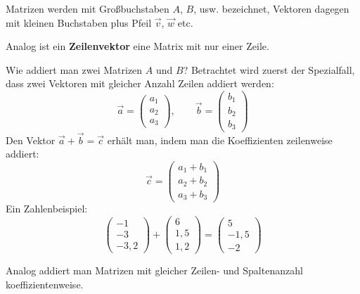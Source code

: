 Matrizen werden mit Großbuchstaben $A$, $B$, usw. bezeichnet, Vektoren dagegen mit kleinen Buchstaben plus Pfeil $\vec{v}$, $\vec{w}$ etc.

Analog ist ein \textbf{Zeilenvektor} eine Matrix mit nur einer Zeile.

Wie addiert man zwei Matrizen $A$ und $B$? Betrachtet wird zuerst der Spezialfall, dass zwei Vektoren mit gleicher Anzahl Zeilen addiert werden:
\[ \vec{a} = \begin{pmatrix} a_1 \\ a_2 \\ a_3 \end{pmatrix} , \qquad \vec{b} = \begin{pmatrix} b_1 \\ b_2 \\ b_3 \end{pmatrix} \]
Den Vektor $\vec{a} + \vec{b} = \vec{c}$ erhält man, indem man die Koeffizienten zeilenweise addiert:
\[ \vec{c} = \begin{pmatrix} a_1 + b_1 \\ a_2 + b_2 \\ a_3 + b_3 \end{pmatrix} \]
Ein Zahlenbeispiel:
\[ \begin{pmatrix} -1 \\ -3 \\ -3{,}2 \end{pmatrix} + \begin{pmatrix} 6 \\ 1{,}5 \\ 1{,}2 \end{pmatrix} = \begin{pmatrix} 5 \\ -1{,}5 \\ -2 \end{pmatrix} \]

Analog addiert man Matrizen mit gleicher Zeilen- und Spaltenanzahl koeffizientenweise.

